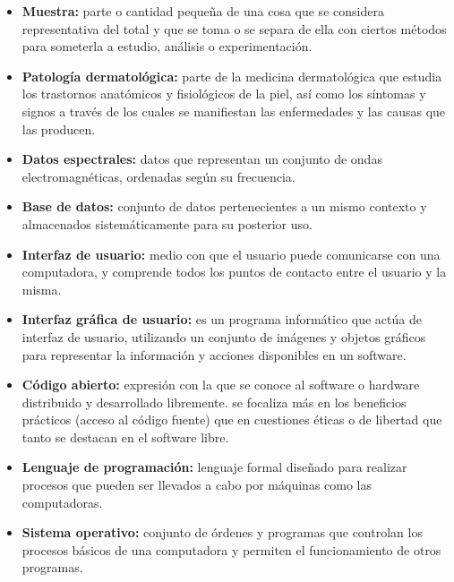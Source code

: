 \begin{itemize}
	\item \textbf{Muestra:} parte o cantidad peque\~{n}a de una cosa que se considera representativa del total y que se toma o se separa de ella con ciertos m\'{e}todos para someterla a estudio, an\'{a}lisis o experimentaci\'{o}n.
	
	\item \textbf{Patolog\'{i}a dermatol\'{o}gica:} parte de la medicina dermatol\'{o}gica que estudia los trastornos anat\'{o}micos y fisiol\'{o}gicos de la piel, as\'{i} como los s\'{i}ntomas y signos a trav\'{e}s de los cuales se manifiestan las enfermedades y las causas que las producen.
	
	\item \textbf{Datos espectrales:} datos que representan un conjunto de ondas electromagn\'{e}ticas, ordenadas seg\'{u}n su frecuencia.
	
	\item \textbf{Base de datos:} conjunto de datos pertenecientes a un mismo contexto y almacenados sistem\'{a}ticamente para su posterior uso.
	
	\item \textbf{Interfaz de usuario:} medio con que el usuario puede comunicarse con una computadora, y comprende todos los puntos de contacto entre el usuario y la misma.
	
	\item \textbf{Interfaz gr\'{a}fica de usuario:} es un programa inform\'{a}tico que act\'{u}a de interfaz de usuario, utilizando un conjunto de im\'{a}genes y objetos gr\'{a}ficos para representar la informaci\'{o}n y acciones disponibles en un software.
	
	\item \textbf{C\'{o}digo abierto:} expresi\'{o}n con la que se conoce al software o hardware distribuido y desarrollado libremente. se focaliza m\'{a}s en los beneficios pr\'{a}cticos (acceso al c\'{o}digo fuente) que en cuestiones \'{e}ticas o de libertad que tanto se destacan en el software libre.
	
	\item \textbf{Lenguaje de programaci\'{o}n:} lenguaje formal dise\~{n}ado para realizar procesos que pueden ser llevados a cabo por m\'{a}quinas como las computadoras.
	
	\item \textbf{Sistema operativo:} conjunto de \'{o}rdenes y programas que controlan los procesos b\'{a}sicos de una computadora y permiten el funcionamiento de otros programas.
	

\end{itemize}
